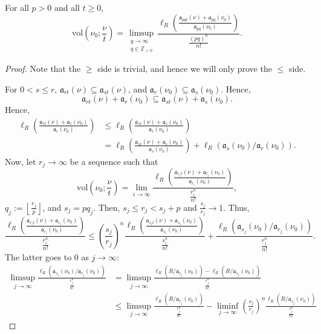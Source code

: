 \documentclass[10pt,a4paper]{amsart}
\newcommand{\Z}{\mathbb{Z}}
\newcommand{\floor}[1]{\left\lfloor #1 \right\rfloor}
\begin{document}
\begin{lemma} \label{3.2}
For all $p>0$ and all $t\ge 0$,
$$ \mathrm{vol}\left(\nu_0;\frac{\nu}{t}\right)=\limsup_{\substack{q\to \infty \\ q\in \Z_{>0}}}\frac{\ell_R\left(\frac{\mathfrak{a}_{pqt}(\nu)+\mathfrak{a}_{pq}(\nu_0)}{\mathfrak{a}_{pq}(\nu_0)}\right)}{\frac{(pq)^n}{n!}}.$$
\end{lemma}

\begin{proof}
Note that the $\ge $ side is trivial, and hence we will only prove the $\le $ side.

\smallskip

For $0<s\le r$, $\mathfrak{a}_{rt}(\nu)\subseteq \mathfrak{a}_{st}(\nu)$, and $\mathfrak{a}_r(\nu_0)\subseteq \mathfrak{a}_s(\nu_0)$. Hence,
$$ \mathfrak{a}_{rt}(\nu)+\mathfrak{a}_r(\nu_0)\subseteq \mathfrak{a}_{st}(\nu)+\mathfrak{a}_s(\nu_0).$$
Hence,
$$ 
\begin{aligned}
\ell_R\left(\frac{\mathfrak{a}_{rt}(\nu)+\mathfrak{a}_r(\nu_0)}{\mathfrak{a}_r(\nu_0)}\right)&\le \ell_R\left(\frac{\mathfrak{a}_{st}(\nu)+\mathfrak{a}_s(\nu_0)}{\mathfrak{a}_r(\nu_0)}\right)
\\ &=\ell_R\left(\frac{\mathfrak{a}_{st}(\nu)+\mathfrak{a}_s(\nu_0)}{\mathfrak{a}_s(\nu_0)}\right)+\ell_R(\mathfrak{a}_s(\nu_0)/\mathfrak{a}_r(\nu_0)).
\end{aligned}
$$
Now, let $r_j\to \infty$ be a sequence such that
$$\mathrm{vol}\left(\nu_0;\frac{\nu}{t}\right)=\lim_{i\to \infty}\frac{\ell_R\left(\frac{\mathfrak{a}_{r_it}(\nu)+\mathfrak{a}_{r_i}(\nu_0)}{\mathfrak{a}_{r_i}(\nu_0)}\right)}{\frac{r^n_i}{n!}},$$
$q_j:=\floor{\frac{r_j}{p}}$, and $s_j=pq_j$. Then, $s_j\le r_j<s_j+p$ and $\frac{s_j}{r_j}\to 1$. Thus,
$$ \frac{\ell_R\left(\frac{\mathfrak{a}_{r_it}(\nu)+\mathfrak{a}_{r_i}(\nu_0)}{\mathfrak{a}_{r_i}(\nu_0)}\right)}{\frac{r^n_i}{n!}}\le \left(\frac{s_j}{r_j}\right)^n\frac{\ell_R\left(\frac{\mathfrak{a}_{s_it}(\nu)+\mathfrak{a}_{s_i}(\nu_0)}{\mathfrak{a}_{s_i}(\nu_0)}\right)}{\frac{s^n_i}{n!}}+\frac{\ell_R(\mathfrak{a}_{s_j}(\nu_0)/\mathfrak{a}_{r_j}(\nu_0))}{\frac{r^n_j}{n!}}.$$
The latter goes to $0$ as $j\to \infty$:
$$ 
\begin{aligned}
\limsup_{j\to \infty}\frac{\ell_R(\mathfrak{a}_{s_j}(\nu_0)/\mathfrak{a}_{r_j}(\nu_0))}{\frac{r^n_j}{n!}}&=\limsup_{j\to \infty}\frac{\ell_R(R/\mathfrak{a}_{r_j}(\nu_0))-\ell_R(R/\mathfrak{a}_{s_j}(\nu_0))}{\frac{r^n_j}{n!}}
\\ &\le \limsup_{j\to \infty}\frac{\ell_R(R/\mathfrak{a}_{r_j}(\nu_0))}{\frac{r^n_j}{n!}}-\liminf_{j\to \infty}\left(\frac{s_j}{r_j}\right)^n\frac{\ell_R(R/\mathfrak{a}_{s_j}(\nu_0))}{\frac{s^n_j}{n!}}

\end{aligned}$$
\end{proof}
\end{document}
